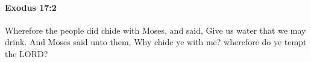 
		\paragraph{Exodus 17:2} %
			\label{EXODUS-17-2}

			Wherefore the people did chide with Moses, and said, Give us water that we may drink. And Moses said unto them, Why chide ye with me? wherefore do ye tempt the LORD?


